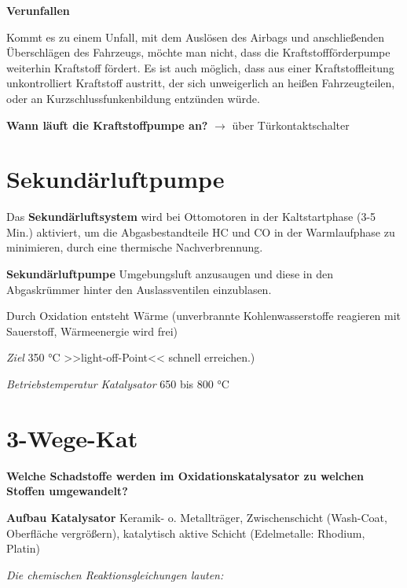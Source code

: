\textbf{Verunfallen}

Kommt es zu einem Unfall, mit dem Auslösen des Airbags und
anschließenden Überschlägen des Fahrzeugs, möchte man nicht, dass die
Kraftstoffförderpumpe weiterhin Kraftstoff fördert. Es ist auch möglich,
dass aus einer Kraftstoffleitung unkontrolliert Kraftstoff austritt, der
sich unweigerlich an heißen Fahrzeugteilen, oder an
Kurzschlussfunkenbildung entzünden würde.

\textbf{Wann läuft die Kraftstoffpumpe an?} $\to$ über
Türkontaktschalter

\section{Sekundärluftpumpe}\label{sekundaerluftpumpe}

Das \textbf{Sekundärluftsystem} wird bei Ottomotoren in der
Kaltstartphase (3-5 Min.) aktiviert, um die Abgasbestandteile HC und CO
in der Warmlaufphase zu minimieren, durch eine thermische
Nachverbrennung.

\textbf{Sekundärluftpumpe} Umgebungsluft anzusaugen und diese in den
Abgaskrümmer hinter den Auslassventilen einzublasen.

Durch Oxidation entsteht Wärme (unverbrannte Kohlenwasserstoffe
reagieren mit Sauerstoff, Wärmeenergie wird frei)

\emph{Ziel} 350 °C >>light-off-Point<< schnell erreichen.)

\emph{Betriebstemperatur Katalysator} 650 bis 800 °C

\section{3-Wege-Kat}\label{wege-kat}

\textbf{Welche Schadstoffe werden im Oxidationskatalysator zu welchen
Stoffen umgewandelt?}

\textbf{Aufbau Katalysator} Keramik- o. Metallträger, Zwischenschicht
(Wash-Coat, Oberfläche vergrößern), katalytisch aktive Schicht
(Edelmetalle: Rhodium, Platin)

\emph{Die chemischen Reaktionsgleichungen lauten:}

